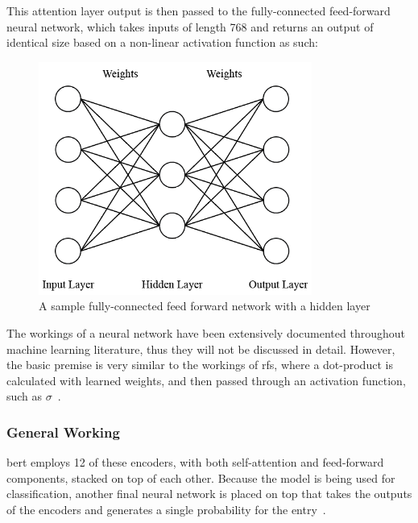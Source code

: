 This attention layer output is then passed to the fully-connected feed-forward neural network, which takes inputs of length 768 and returns an output of identical size based on a non-linear activation function as such:

\begin{figure}[H]
\centering
\includegraphics[width=0.8\textwidth]{fig/full_neural.png}
\caption{A sample fully-connected feed forward network with a hidden layer}
\label{fig:neural-network}
\end{figure}

The workings of a neural network have been extensively documented throughout machine learning literature, thus they will not be discussed in detail. However, the basic premise is very similar to the workings of \acrshort{rfs}, where a dot-product is calculated with learned weights, and then passed through an activation function, such as $\sigma$~\parencite{lecun2015deep}.

\subsubsection{General Working}
\acrshort{bert} employs 12 of these encoders, with both self-attention and feed-forward components, stacked on top of each other. Because the model is being used for classification, another final neural network is placed on top that takes the outputs of the encoders and generates a single probability for the entry~\parencite{sun2019finetune}.